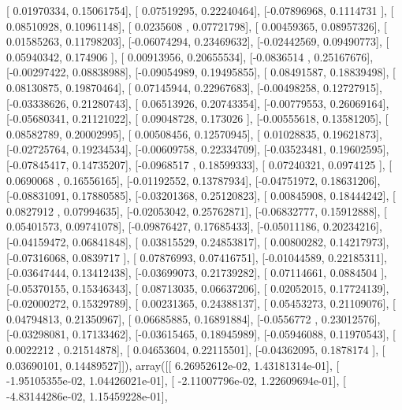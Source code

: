 \documentclass{article}
\begin{document}
       [ 0.01970334,  0.15061754],
       [ 0.07519295,  0.22240464],
       [-0.07896968,  0.1114731 ],
       [ 0.08510928,  0.10961148],
       [ 0.0235608 ,  0.07721798],
       [ 0.00459365,  0.08957326],
       [ 0.01585263,  0.11798203],
       [-0.06074294,  0.23469632],
       [-0.02442569,  0.09490773],
       [ 0.05940342,  0.174906  ],
       [ 0.00913956,  0.20655534],
       [-0.0836514 ,  0.25167676],
       [-0.00297422,  0.08838988],
       [-0.09054989,  0.19495855],
       [ 0.08491587,  0.18839498],
       [ 0.08130875,  0.19870464],
       [ 0.07145944,  0.22967683],
       [-0.00498258,  0.12727915],
       [-0.03338626,  0.21280743],
       [ 0.06513926,  0.20743354],
       [-0.00779553,  0.26069164],
       [-0.05680341,  0.21121022],
       [ 0.09048728,  0.173026  ],
       [-0.00555618,  0.13581205],
       [ 0.08582789,  0.20002995],
       [ 0.00508456,  0.12570945],
       [ 0.01028835,  0.19621873],
       [-0.02725764,  0.19234534],
       [-0.00609758,  0.22334709],
       [-0.03523481,  0.19602595],
       [-0.07845417,  0.14735207],
       [-0.0968517 ,  0.18599333],
       [ 0.07240321,  0.0974125 ],
       [ 0.0690068 ,  0.16556165],
       [-0.01192552,  0.13787934],
       [-0.04751972,  0.18631206],
       [-0.08831091,  0.17880585],
       [-0.03201368,  0.25120823],
       [ 0.00845908,  0.18444242],
       [ 0.0827912 ,  0.07994635],
       [-0.02053042,  0.25762871],
       [-0.06832777,  0.15912888],
       [ 0.05401573,  0.09741078],
       [-0.09876427,  0.17685433],
       [-0.05011186,  0.20234216],
       [-0.04159472,  0.06841848],
       [ 0.03815529,  0.24853817],
       [ 0.00800282,  0.14217973],
       [-0.07316068,  0.0839717 ],
       [ 0.07876993,  0.07416751],
       [-0.01044589,  0.22185311],
       [-0.03647444,  0.13412438],
       [-0.03699073,  0.21739282],
       [ 0.07114661,  0.0884504 ],
       [-0.05370155,  0.15346343],
       [ 0.08713035,  0.06637206],
       [ 0.02052015,  0.17724139],
       [-0.02000272,  0.15329789],
       [ 0.00231365,  0.24388137],
       [ 0.05453273,  0.21109076],
       [ 0.04794813,  0.21350967],
       [ 0.06685885,  0.16891884],
       [-0.0556772 ,  0.23012576],
       [-0.03298081,  0.17133462],
       [-0.03615465,  0.18945989],
       [-0.05946088,  0.11970543],
       [ 0.0022212 ,  0.21514878],
       [ 0.04653604,  0.22115501],
       [-0.04362095,  0.1878174 ],
       [ 0.03690101,  0.14489527]]), array([[  6.26952612e-02,   1.43181314e-01],
       [ -1.95105355e-02,   1.04426021e-01],
       [ -2.11007796e-02,   1.22609694e-01],
       [ -4.83144286e-02,   1.15459228e-01],
\end{document}
